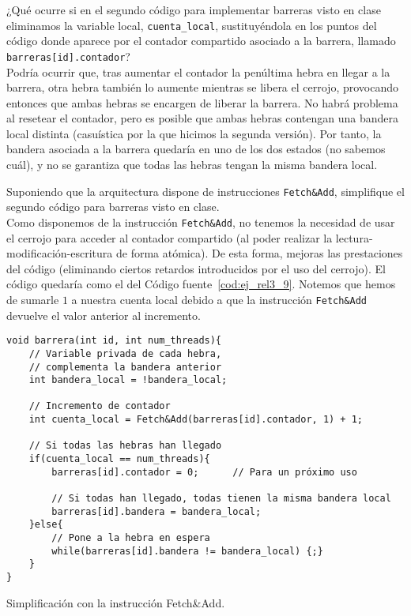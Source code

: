\begin{ejercicio}\label{ej:rel3_8}
    ¿Qué ocurre si en el segundo código para implementar barreras visto en clase eliminamos la variable local, \verb|cuenta_local|, sustituyéndola en los puntos del código donde aparece por el contador compartido asociado a la barrera, llamado \verb|barreras[id].contador|?\\

    Podría ocurrir que, tras aumentar el contador la penúltima hebra en llegar a la barrera, otra hebra también lo aumente mientras se libera el cerrojo,
    provocando entonces que ambas hebras se encargen de liberar la barrera. No habrá
    problema al resetear el contador, pero es posible que ambas hebras contengan una bandera local distinta (casuística por la que hicimos la segunda versión).
    Por tanto, la bandera asociada a la barrera quedaría en uno de los dos estados (no sabemos cuál), y no se garantiza que todas las hebras tengan la misma bandera local.
\end{ejercicio}

\begin{ejercicio}
    Suponiendo que la arquitectura dispone de instrucciones \verb|Fetch&Add|, simplifique el segundo código para barreras visto en clase.\\

    Como disponemos de la instrucción \verb|Fetch&Add|, no tenemos la necesidad de usar el cerrojo para acceder al contador compartido (al poder realizar la lectura-modificación-escritura de forma atómica). De esta forma, mejoras las prestaciones del código (eliminando ciertos retardos introducidos por el uso del cerrojo). El código quedaría como el del Código fuente~\ref{cod:ej_rel3_9}.
    Notemos que hemos de sumarle $1$ a nuestra cuenta local debido a que la instrucción \verb|Fetch&Add| devuelve el valor anterior al incremento.
\begin{listing}[H]
\begin{verbatim}
void barrera(int id, int num_threads){
    // Variable privada de cada hebra,
    // complementa la bandera anterior
    int bandera_local = !bandera_local;

    // Incremento de contador
    int cuenta_local = Fetch&Add(barreras[id].contador, 1) + 1;

    // Si todas las hebras han llegado
    if(cuenta_local == num_threads){
        barreras[id].contador = 0;      // Para un próximo uso

        // Si todas han llegado, todas tienen la misma bandera local
        barreras[id].bandera = bandera_local;
    }else{
        // Pone a la hebra en espera
        while(barreras[id].bandera != bandera_local) {;}
    }
}
\end{verbatim}
\caption{Simplificación con la instrucción Fetch\&Add.}
\label{cod:ej_rel3_9}
\end{listing}

\end{ejercicio}

